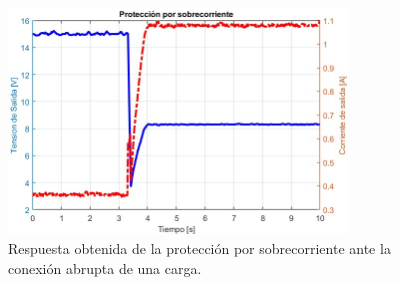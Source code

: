 \begin{figure}[H]
    \centering
    \includegraphics[width=0.8\textwidth]{./imagenes/MedicionConPuntaCorriente_proteccionRapida.jpg}
    \caption{Respuesta obtenida de la protección por sobrecorriente ante la conexión abrupta de una carga.}
    \label{F:Pcorriente2}
\end{figure}\par 

